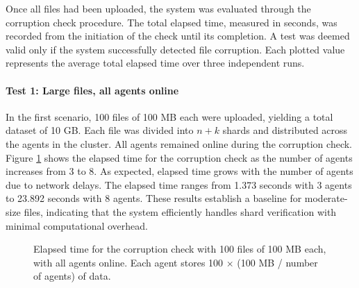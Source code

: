 Once all files had been uploaded, the system was evaluated through the corruption check procedure. The total elapsed time, measured in seconds, was recorded from the initiation of the check until its completion. A test was deemed valid only if the system successfully detected file corruption. Each plotted value represents the average total elapsed time over three independent runs.

\paragraph{Test 1: Large files, all agents online}

In the first scenario, 100 files of 100 MB each were uploaded, yielding a total
dataset of 10 GB. Each file was divided into $n+k$ shards and distributed across
the agents in the cluster. All agents remained online during the corruption
check. Figure \ref{fig:test-1} shows the elapsed time for the corruption check
as the number of agents increases from 3 to 8. As expected, elapsed time grows
with the number of agents due to network delays. The elapsed time ranges from 1.373 seconds with 3 agents to 23.892 seconds with 8 agents. These results establish a baseline for moderate-size files, indicating that the system efficiently handles shard verification with minimal computational overhead.

\begin{figure}[!ht]
\centering
{}
\caption{Elapsed time for the corruption check with 100 files of 100 MB each,
    with all agents online. Each agent stores 100 $\times$ (100 MB / number of agents) of data.}
\label{fig:test-1}
\end{figure}


